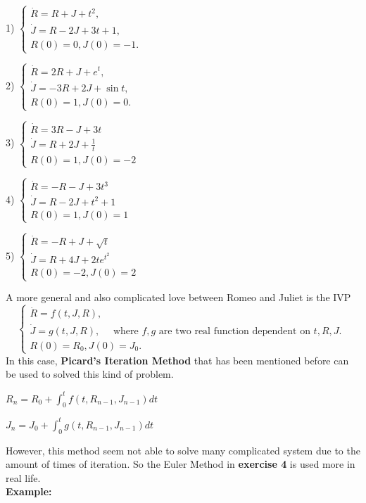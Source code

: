 \documentclass[a4paper]{article}
\begin{document}
1) $\left\{\begin{array}{l}\dot{R}=R+J+t^2, \\ \dot{J}=R-2 J+3 t+1, \\ R(0)=0, J(0)=-1 .\end{array}\right.$

2) $\left\{\begin{array}{l}\dot{R}=2 R+J+e^t, \\ \dot{J}=-3 R+2 J+\sin t, \\ R(0)=1, J(0)=0 .\end{array}\right.$

3) $\left\{\begin{array}{l}\dot{R}=3 R-J+3 t \\ \dot{J}=R+2 J+\frac{1}{t} \\ R(0)=1, J(0)=-2\end{array}\right.$

4) $\left\{\begin{array}{l}\dot{R}=-R-J+3 t^3 \\ \dot{J}=R-2 J+t^2+1 \\ R(0)=1, J(0)=1\end{array}\right.$

5) $\left\{\begin{array}{l}\dot{R}=-R+J+\sqrt{t} \\ \dot{J}=R+4 J+2 t e^{t^2} \\ R(0)=-2, J(0)=2\end{array}\right.$

A more general and also complicated love between Romeo and Juliet is the IVP
$$
\left\{\begin{array}{l}
	\dot{R}=f(t, J, R), \\
	\dot{J}=g(t, J, R), \quad \text { where } f, g \text { are two real function dependent on } t, R, J \text {. } \\
	R(0)=R_{0}, J(0)=J_{0} .
\end{array}\right.
$$
In this case, \textbf{Picard's Iteration Method} that has been mentioned before can be used to solved this kind of problem.\\
\begin{center}
$R_n=R_0+\int_0^t f\left(t, R_{n-1}, J_{n-1}\right) d t$
\end{center}
\begin{center}
$J_n=J_0+\int_0^t g\left(t, R_{n-1}, J_{n-1}\right) d t$
\end{center}

However, this method seem not able to solve many complicated system due to the amount of times of iteration. So the Euler Method in \textbf{exercise 4} is used more in real life.\\
{\bf  Example:}
\end{document}
